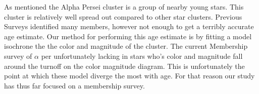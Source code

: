 \documentclass[12pt]{article}
\begin{document}
\Huge{As mentioned the Alpha Persei cluster is a group of nearby young stars.  This cluster is relatively well spread out compared to other star clusters.  Previous Surveys identified many members, however not enough to get a terribly accurate age estimate.  Our method for performing this age estimate is by fitting a model isochrone the the color and magnitude of the cluster.  The current Membership survey of $\alpha$ per unfortunately lacking in stars who's color and magnitude fall around the turnoff on the color magnitude diagram. This is unfortunately the point at which these model diverge the most with age.  For that reason our study has thus far focused on a membership survey.}
\end{document}
